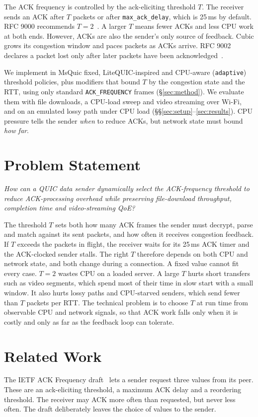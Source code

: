 \documentclass[11pt]{article}
\newcommand{\pol}[1]{\texttt{#1}}            %
\newcommand{\ms}{\,ms}
\begin{document}
The ACK frequency is controlled by the ack-eliciting threshold $T$. The receiver sends an ACK after
$T$ packets or after \pol{max\_ack\_delay}, which is 25\ms{} by default. RFC 9000 recommends
$T{=}2$~\cite{rfc9000}. A larger $T$ means fewer ACKs and less CPU work at both ends. However, ACKs
are also the sender's only source of feedback. Cubic grows its congestion window and paces packets
as ACKs arrive. RFC 9002 declares a packet lost only after later packets have been
acknowledged~\cite{rfc9002}.

We implement in MsQuic fixed, LiteQUIC-inspired and CPU-aware (\pol{adaptive}) threshold policies,
plus modifiers that bound $T$ by the congestion state and the RTT, using only standard
\pol{ACK\_FREQUENCY} frames (\S\ref{sec:method}). We evaluate them with file downloads, a CPU-load sweep and video
streaming over Wi-Fi, and on an emulated lossy path under CPU load (\S\S\ref{sec:setup}--\ref{sec:results}). CPU pressure tells the
sender \emph{when} to reduce ACKs, but network state must bound \emph{how far}.

\section{Problem Statement}\label{sec:problem}
\noindent\emph{How can a QUIC data sender dynamically select the ACK-frequency threshold to reduce
ACK-processing overhead while preserving file-download throughput, completion time and
video-streaming QoE?}

The threshold $T$ sets both how many ACK frames the sender must decrypt, parse and match against
its sent packets, and how often it receives congestion feedback. If $T$ exceeds the packets in
flight, the receiver waits for its 25\ms{} ACK timer and the ACK-clocked sender stalls. The right
$T$ therefore depends on both CPU and network state, and both change during a connection. A fixed
value cannot fit every case. $T{=}2$ wastes CPU on a loaded server. A large $T$ hurts short
transfers such as video segments, which spend most of their time in slow start with a small
window. It also hurts lossy paths and CPU-starved senders, which send fewer than $T$ packets per
RTT. The technical problem is to choose $T$ at run time from observable CPU and network signals,
so that ACK work falls only when it is costly and only as far as the feedback loop can tolerate.

\section{Related Work}
The IETF ACK Frequency draft~\cite{ackfreq14} lets a sender request three values from its peer.
These are an ack-eliciting threshold, a maximum ACK delay and a reordering threshold. The receiver
may ACK more often than requested, but never less often. The draft deliberately leaves the choice
of values to the sender.
\end{document}
